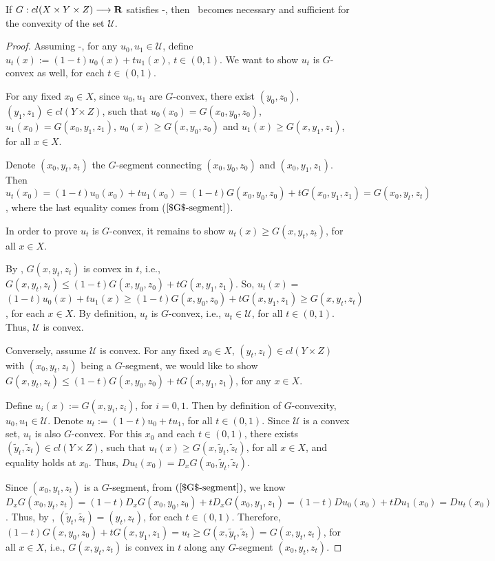 \begin{theorem}\label{convex set}
	If $G: cl(X\times Y\times Z) \longrightarrow {\mathbf R}$ satisfies \Gzero-\Gtwo, then \Gthree\ becomes necessary and sufficient for the convexity of the set $\mathcal{U}$.
\end{theorem}
\begin{proof}
	Assuming \Gzero-\Gtwo, for any $u_0, u_1 \in \mathcal{U}$, define $u_t(x) := (1-t)u_0(x)+tu_1(x)$, $t\in (0,1)$. We want to show $u_t$ is $G$-convex as well, for each $t\in (0,1)$. 
	
	For any fixed $x_0 \in X$, since $u_0, u_1$ are $G$-convex, there exist $(y_0,z_0),$ $ (y_1, z_1) \in cl( Y \times Z)$, such that $u_0(x_0)= G(x_0, y_0,z_0)$, $u_1(x_0)=G(x_0,y_1,z_1)$, $u_0(x)\ge G(x,y_0,z_0)$ and $u_1(x)\ge G(x,y_1,z_1)$, for all $ x\in X$. 
	
	Denote $(x_0, y_t, z_t)$ the $G$-segment connecting $(x_0, y_0, z_0)$ and $(x_0, y_1, z_1)$. Then $u_t(x_0) = (1-t)u_0(x_0)+tu_1(x_0)=(1-t) G(x_0, y_0,z_0)+ tG(x_0,y_1,z_1) = G(x_0,y_t, z_t)$, where the last equality comes from ($\ref{$G$-segment}$). 
	
	In order to prove $u_t$ is $G$-convex, it remains to show $u_t(x)\ge  G(x,y_t,z_t)$, for all $x\in X$. 
	
	By \Gthree, $G(x, y_t, z_t)$ is convex in $t$, i.e., $G(x,y_t,z_t)\le (1-t)G(x, y_0,z_0)+tG(x, y_1, z_1)$. So, $u_t(x)=$ $  (1-t)u_0(x)+tu_1(x) \ge (1-t) G(x,y_0,z_0)+tG(x, y_1, z_1)\ge G(x, y_t, z_t)$, for each $x \in X$. By definition, $u_t$ is $G$-convex, i.e., $u_t\in \mathcal{U}$, for all $t \in (0,1)$. Thus, $\mathcal{U}$ is convex.\medskip
	
	Conversely, assume $\mathcal{U}$ is convex. For any fixed $x_0 \in X$, $(y_t,z_t) \in cl( Y \times Z)$ with $(x_0, y_t, z_t)$ being a $G$-segment, we would like to show $G(x,y_t, z_t) \le (1-t)G(x,y_0,z_0)+tG(x,y_1, z_1)$, for any $x\in X$.
	

	
	Define $u_i(x) := G(x, y_i, z_i)$, for $i=0,1$. Then by definition of $G$-convexity, $u_0, u_1 \in \mathcal{U}$. Denote $u_t:= (1-t)u_0+tu_1$, for all $t\in (0,1)$. Since $\mathcal{U}$ is a convex set, $u_t$ is also $G$-convex. For this $x_0$ and each $t\in (0,1)$, there exists $(\tilde{y}_t, \tilde{z}_t) \in cl( Y \times Z)$, such that $u_t(x)\ge G(x, \tilde{y}_t, \tilde{z}_t)$, for all $x\in X$, and equality holds at $x_0$. Thus, $Du_t(x_0) = D_x G(x_0, \tilde{y}_t, \tilde{z}_t)$.
	
	Since $(x_0, y_t, z_t)$ is a $G$-segment, from $(\ref{$G$-segment})$, we know $D_x G(x_0, y_t, z_t) = (1-t) D_x G(x_0, y_0, z_0) +t D_x G(x_0, y_1, z_1) = (1-t) Du_0(x_0) +t Du_1(x_0) = Du_t(x_0)$. Thus, by \Gone,  $(\tilde{y}_t , \tilde{z_t}) = (y_t, z_t)$, for each $t\in (0,1)$. Therefore, $(1-t)G(x,y_0,z_0)+tG(x,y_1, z_1) = u_t \ge G(x, \tilde{y}_t, \tilde{z}_t) = G(x, y_t, z_t)$, for all $x\in X$, i.e., $G(x, y_t, z_t)$ is convex in $t$ along any $G$-segment $(x_0, y_t, z_t)$.
\end{proof}



